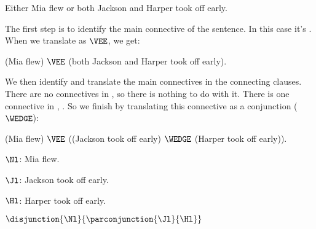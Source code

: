 \begin{majorILnc}{} %
	\begin{menumerate}
		\item\label{GSLTransSentenceE} Either Mia flew or both Jackson and Harper took off early.
	\end{menumerate} 
	The first step is to identify the main connective of the sentence. 
	In this case it's . When we translate  as $\VEE$, we get: 
	\begin{menumerate}
		\item\label{GSLTransSentenceF} (Mia flew) $\VEE$ (both Jackson and Harper took off early).
	\end{menumerate}
	We then identify and translate the main connectives in the connecting clauses. 
	There are no connectives in , so there is nothing to do with it. 
	There is one connective in , . 
	So we finish by translating this connective as a conjunction ($\WEDGE$):  
	\begin{menumerate}
		\item\label{GSLTransSentenceG} (Mia flew) $\VEE$ ((Jackson took off early) $\WEDGE$ (Harper took off early)).
	\end{menumerate}
	\begin{description}[itemsep=0em]
		\item[Translation Key:] \hfill{} 
		\begin{description}[itemsep=0em]
			\item[] $\Nl$: Mia flew.
			\item[] $\Jl$: Jackson took off early. 
			\item[] $\Hl$: Harper took off early. 
		\end{description}
	\end{description}
	\begin{menumerate}
		\item\label{GSLTransSentenceH} $\disjunction{\Nl}{\parconjunction{\Jl}{\Hl}}$
	\end{menumerate}
\end{majorILnc}

